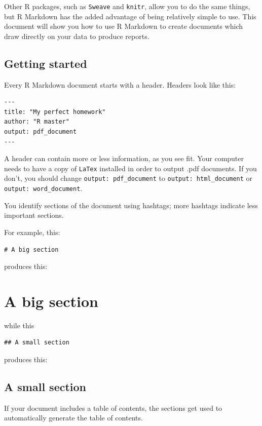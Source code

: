 \documentclass[
  letterpaper,
  DIV=11,
  numbers=noendperiod]{scrreprt}
\begin{document}
Other R packages, such as \texttt{Sweave} and \texttt{knitr}, allow you
to do the same things, but R Markdown has the added advantage of being
relatively simple to use. This document will show you how to use R
Markdown to create documents which draw directly on your data to produce
reports.

\section{Getting started}\label{getting-started}

Every R Markdown document starts with a header. Headers look like this:

\begin{verbatim}
---
title: "My perfect homework"
author: "R master"
output: pdf_document
---
\end{verbatim}

A header can contain more or less information, as you see fit. Your
computer needs to have a copy of \texttt{LaTex} installed in order to
output .pdf documents. If you don't, you should change
\texttt{output:\ pdf\_document} to \texttt{output:\ html\_document} or
\texttt{output:\ word\_document}.

You identify sections of the document using hashtags; more hashtags
indicate less important sections.

For example, this:

\begin{verbatim}
# A big section
\end{verbatim}

produces this:

\chapter{A big section}\label{a-big-section}

while this

\begin{verbatim}
## A small section
\end{verbatim}

produces this:

\section{A small section}\label{a-small-section}

If your document includes a table of contents, the sections get used to
automatically generate the table of contents.
\end{document}
